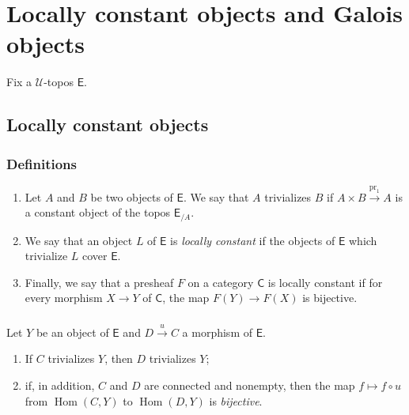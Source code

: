 \documentclass[10pt,oneside]{amsart}
\newcommand{\oldpage}[1]{\marginnote{\textbf{#1}}}
\newcommand{\cal}{\mathcal}
\newcommand{\cat}{\mathsf}
\DeclareMathOperator{\Hom}{Hom}
\DeclareMathOperator{\pr}{pr}
\begin{document}
\section{Locally constant objects and Galois objects}
\oldpage{5}

Fix a $\cal{U}$-topos $\cat{E}$.

\subsection{Locally constant objects}
\subsubsection{Definitions}
\begin{enumerate}[label=(\arabic*)]
  \item Let $A$ and $B$ be two objects of $\cat{E}$.
    We say that $A$ trivializes $B$ if $A\times B\xrightarrow{\pr_1}A$ is a constant object of the topos $\cat{E}_{/A}$.
  \item We say that an object $L$ of $\cat{E}$ is \emph{locally constant} if the objects of $\cat{E}$ which trivialize $L$ cover $\cat{E}$.
  \item Finally, we say that a presheaf $F$ on a category $\cat{C}$ is locally constant if for every morphism $X\to Y$ of $\cat{C}$, the map $F(Y)\to F(X)$ is bijective.
\end{enumerate}

\subsubsection{}
Let $Y$ be an object of $\cat{E}$ and $D\xrightarrow{u}C$ a morphism of $\cat{E}$.
\begin{enumerate}[label=(\roman*)]
  \item If $C$ trivializes $Y$, then $D$ trivializes $Y$;
  \item if, in addition, $C$ and $D$ are connected and nonempty, then the map $f\mapsto f\circ u$ from $\Hom(C,Y)$ to $\Hom(D,Y)$ is \emph{bijective}.
\end{enumerate}
\end{document}
